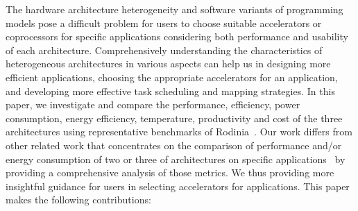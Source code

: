 The hardware architecture heterogeneity and software variants of programming models pose a difficult problem for users to 
choose suitable accelerators or coprocessors for specific applications considering both performance and usability of each architecture. 
Comprehensively understanding the characteristics of heterogeneous architectures in various aspects can help us in 
designing more efficient applications, choosing the appropriate accelerators for an application, 
and developing more effective task scheduling and mapping strategies. In this paper, we investigate and compare the performance, 
efficiency, power consumption, energy efficiency, temperature, productivity and cost of the three architectures using representative 
benchmarks of Rodinia~\cite{R:1}. 
Our work differs from other related work that concentrates on the comparison of performance and/or energy 
consumption of two or three of architectures on specific applications~\cite{cite1, cite2, cite3, citemore} by providing a comprehensive analysis of those metrics. We thus
providing more insightful guidance for users in selecting accelerators for applications.  
This paper makes the following contributions: 



  

